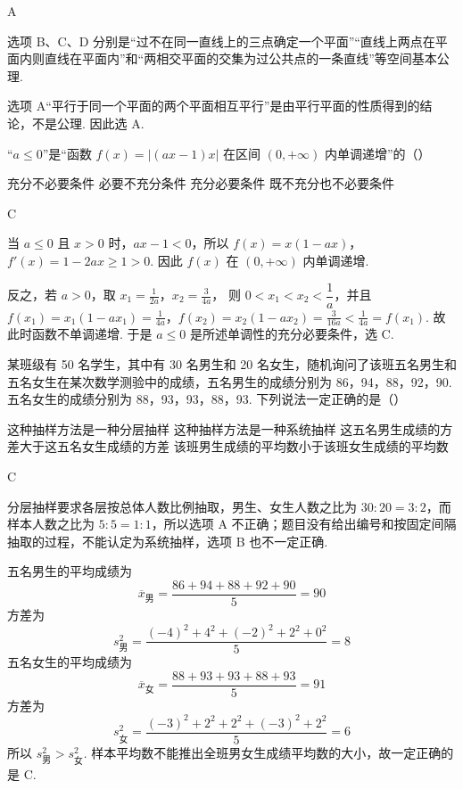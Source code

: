 \begin{answer}
A
\end{answer}

\begin{solution}
选项 B、C、D 分别是“过不在同一直线上的三点确定一个平面”“直线上两点在平面内则直线在平面内”和“两相交平面的交集为过公共点的一条直线”等空间基本公理.

选项 A“平行于同一个平面的两个平面相互平行”是由平行平面的性质得到的结论，不是公理. 因此选 A.
\end{solution}

\begin{problem}
“\(a \leqslant 0\)”是“函数 \(f(x) = |(ax - 1)x|\) 在区间 \((0, +\infty)\) 内单调递增”的（\quad）

\choices
    {充分不必要条件}
    {必要不充分条件}
    {充分必要条件}
    {既不充分也不必要条件}
\end{problem}

\begin{answer}
C
\end{answer}

\begin{solution}
当 \(a\leqslant0\) 且 \(x>0\) 时，\(ax-1<0\)，所以
\(f(x)=x(1-ax)\)，\(f'(x)=1-2ax\geqslant1>0\).
因此 \(f(x)\) 在 \((0,+\infty)\) 内单调递增.

反之，若 \(a>0\)，取
\(x_1=\frac{1}{2a}\)，\(x_2=\frac{3}{4a}\)，
则 \(0<x_1<x_2<\dfrac1a\)，并且
\(f(x_1)=x_1(1-ax_1)=\frac{1}{4a}\)，\(f(x_2)=x_2(1-ax_2)=\frac{3}{16a}<\frac{1}{4a}=f(x_1)\).
故此时函数不单调递增. 于是 \(a\leqslant0\) 是所述单调性的充分必要条件，选 C.
\end{solution}

\begin{problem}
某班级有 50 名学生，其中有 30 名男生和 20 名女生，随机询问了该班五名男生和五名女生在某次数学测验中的成绩，五名男生的成绩分别为 86，94，88，92，90. 五名女生的成绩分别为 88，93，93，88，93. 下列说法一定正确的是（\quad）

\choices
    {这种抽样方法是一种分层抽样}
    {这种抽样方法是一种系统抽样}
    {这五名男生成绩的方差大于这五名女生成绩的方差}
    {该班男生成绩的平均数小于该班女生成绩的平均数}
\end{problem}

\begin{answer}
C
\end{answer}

\begin{solution}
分层抽样要求各层按总体人数比例抽取，男生、女生人数之比为 \(30:20=3:2\)，而样本人数之比为 \(5:5=1:1\)，所以选项 A 不正确；题目没有给出编号和按固定间隔抽取的过程，不能认定为系统抽样，选项 B 也不一定正确.

五名男生的平均成绩为
\[
\overline{x}_{\text{男}}=\frac{86+94+88+92+90}{5}=90
\]
方差为
\[
s_{\text{男}}^2=\frac{(-4)^2+4^2+(-2)^2+2^2+0^2}{5}=8
\]
五名女生的平均成绩为
\[
\overline{x}_{\text{女}}=\frac{88+93+93+88+93}{5}=91
\]
方差为
\[
s_{\text{女}}^2=\frac{(-3)^2+2^2+2^2+(-3)^2+2^2}{5}=6
\]
所以 \(s_{\text{男}}^2>s_{\text{女}}^2\). 样本平均数不能推出全班男女生成绩平均数的大小，故一定正确的是 C.
\end{solution}

